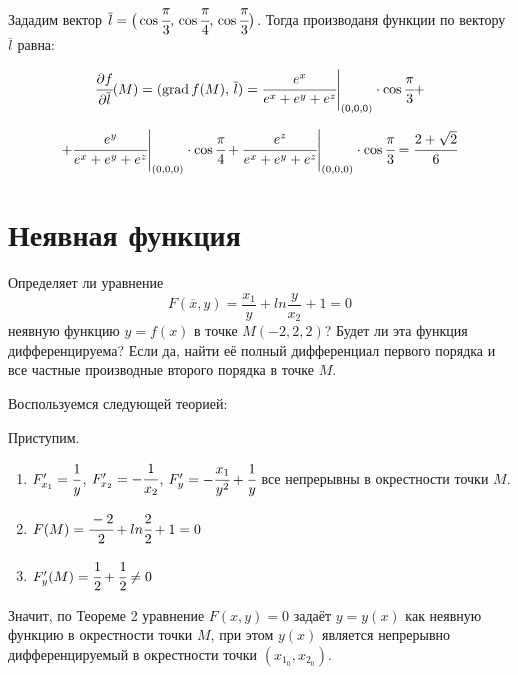 \documentclass[12pt]{report}
\DeclarePairedDelimiter\evaluat{.}{\rvert}
\begin{document}
Зададим вектор $\overline{l}=\big(\cos\cfrac{\pi}{3},\,\cos\cfrac{\pi}{4},\,\cos\cfrac{\pi}{3}\big)$. Тогда производаня функции по вектору $\overline{l}$ равна:

$$ \cfrac{\partial f}{\partial \overline{l}}(M)=(\text{grad}\,f(M),\,\overline{l})=  \evaluat[\Bigg]{\cfrac{e^x}{e^x+e^y+e^z}}_{(0,0,0)} \cdot\cos\cfrac{\pi}{3}+$$

$$+\evaluat[\Bigg]{\cfrac{e^y}{e^x+e^y+e^z}}_{(0,0,0)} \cdot\cos\cfrac{\pi}{4}+\evaluat[\Bigg]{\cfrac{e^z}{e^x+e^y+e^z}}_{(0,0,0)} \cdot\cos\cfrac{\pi}{3}=\cfrac{2+\sqrt{2}}{6}$$



\chapter{Неявная функция}
Определяет ли уравнение 
$$F(\overline{x},y)=\frac{x_1}{y}+ln\frac{y}{x_2}+1=0$$ 
неявную функцию $y=f(x)$ в точке $M(-2,2,2)$? Будет ли эта функция дифференцируема? Если да, найти её полный дифференциал первого порядка и все частные производные второго порядка в точке $M$.

Воспользуемся следующей теорией:
\begin{center}
\end{center}
\begin{center}
\end{center}
Приступим.
\begin{enumerate}
    \item $F_{x_1}'=\cfrac{1}{y}$, $F_{x_2}'=-\cfrac{1}{x_2}$, $F_y' =-\cfrac{x_1}{y^2}+\cfrac{1}{y}$ все непрерывны в окрестности точки $M$.
    \item $F(M)=\cfrac{-2}{2}+ln\cfrac{2}{2}+1=0$
    \item $F_y'(M)=\cfrac{1}{2}+\cfrac{1}{2}\ne0$
\end{enumerate}
Значит, по Теореме 2 уравнение $F(x,y)=0$ задаёт $y=y(x)$ как неявную функцию в окрестности точки $M$, при этом $y(x)$ является непрерывно дифференцируемый в окрестности точки $(x_{1_0}, x_{2_0})$.
\end{document}
